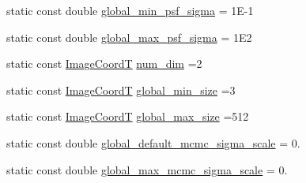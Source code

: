 \begin{DoxyCompactItemize}
\item 
static const double \hyperlink{classmappel_1_1PointEmitterModel_a77d0ca98d77cb8b94117ece2a5b182a4}{global\+\_\+min\+\_\+psf\+\_\+sigma} = 1\+E-\/1
\item 
static const double \hyperlink{classmappel_1_1PointEmitterModel_a5e79dba8966c25c4e9c675cd1a2cab70}{global\+\_\+max\+\_\+psf\+\_\+sigma} = 1\+E2
\item 
static const \hyperlink{classmappel_1_1ImageFormat2DBase_a45e9234d63c357f34ca56c72c12b9e9c}{Image\+CoordT} \hyperlink{classmappel_1_1ImageFormat2DBase_a9c29fcaf30faffc77b41ba556ebb0127}{num\+\_\+dim} =2
\item 
static const \hyperlink{classmappel_1_1ImageFormat2DBase_a45e9234d63c357f34ca56c72c12b9e9c}{Image\+CoordT} \hyperlink{classmappel_1_1ImageFormat2DBase_a1149e8545d3cfaa40c2f3bc02e3223b2}{global\+\_\+min\+\_\+size} =3
\item 
static const \hyperlink{classmappel_1_1ImageFormat2DBase_a45e9234d63c357f34ca56c72c12b9e9c}{Image\+CoordT} \hyperlink{classmappel_1_1ImageFormat2DBase_a11c9bb87930f597dff17e9923b73bf5e}{global\+\_\+max\+\_\+size} =512
\item 
static const double \hyperlink{classmappel_1_1MCMCAdaptorBase_a44cebca0e27135c854fa8430d2d89929}{global\+\_\+default\+\_\+mcmc\+\_\+sigma\+\_\+scale} = 0.
\item 
static const double \hyperlink{classmappel_1_1MCMCAdaptorBase_aebc93881ca351e67de867238a62579eb}{global\+\_\+max\+\_\+mcmc\+\_\+sigma\+\_\+scale} = 0.
\end{DoxyCompactItemize}
